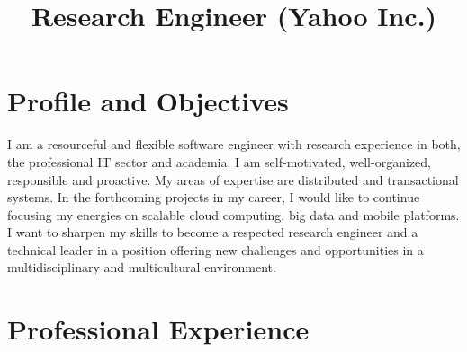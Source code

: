 \documentclass[10pt,a4paper]{moderncv}
\title{Research Engineer (Yahoo Inc.)}
\begin{document}
\maketitle
\vspace{-1cm}

\section{Profile and Objectives}
\small I am a resourceful and flexible software engineer with research experience in both, the professional IT sector and academia. I am self-motivated, well-organized, responsible and proactive.
My areas of expertise are distributed and transactional systems. In the forthcoming projects in my career, I would like to continue focusing my energies on scalable cloud computing, big data and mobile platforms. I want to sharpen my skills to become a respected research engineer and a technical leader in a position offering new challenges and opportunities in a multidisciplinary and multicultural environment.

\section{Professional Experience}

\end{document}
